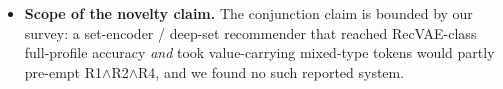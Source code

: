 \documentclass[11pt]{article}
\begin{document}
\begin{itemize}[leftmargin=1.4em,itemsep=3pt]
        Turbo-CF is re-run on our split with $(\alpha,s,\text{filter})$ selected on our validation users and is
        reported as best-effort tuned; GF-CF and BSPM are not run here and carry no number.
  \item \textbf{Scope of the novelty claim.} The conjunction claim is bounded by our survey: a set-encoder /
        deep-set recommender that reached RecVAE-class full-profile accuracy \emph{and} took value-carrying
        mixed-type tokens would partly pre-empt R1$\wedge$R2$\wedge$R4, and we found no such reported system.
\end{itemize}



\end{document}
